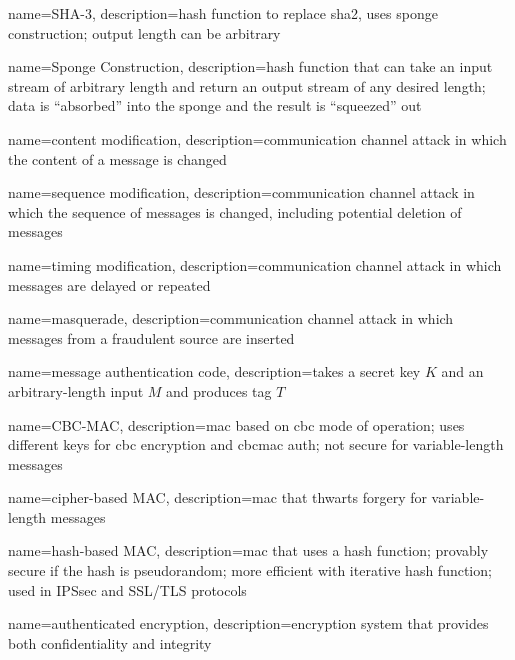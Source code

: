 {
    name={SHA-3},
    description={hash function to replace \gls{sha2}, uses \gls{sponge construction}; output length can be arbitrary}
}

{
    name={Sponge Construction},
    description={hash function that can take an input stream of arbitrary length and return an output stream of any desired length; data is ``absorbed'' into the sponge and the result is ``squeezed'' out}
}

{
    name={content modification},
    description={communication channel attack in which the content of a message is changed}
}

{
    name={sequence modification},
    description={communication channel attack in which the sequence of messages is changed, including potential deletion of messages}
}

{
    name={timing modification},
    description={communication channel attack in which messages are delayed or repeated}
}

{
    name={masquerade},
    description={communication channel attack in which messages from a fraudulent source are inserted}
}

{
    name={message authentication code},
    description={takes a secret key $K$ and an arbitrary-length input $M$ and produces tag $T$}
}

{
    name={CBC-MAC},
    description={\acrshort{mac} based on \acrfull{cbc} mode of operation; uses different keys for \acrshort*{cbc} encryption and \gls*{cbcmac} auth; not secure for variable-length messages}
}

{
    name={cipher-based MAC},
    description={\acrshort{mac} that thwarts forgery for variable-length messages}
}

{
    name={hash-based MAC},
    description={\acrshort{mac} that uses a hash function; provably secure if the hash is pseudorandom; more efficient with \gls{iterative hash function}; used in IPSsec and SSL/TLS protocols}
}

{
    name={authenticated encryption},
    description={encryption system that provides both \gls{confidentiality} and \gls{integrity}}
}

